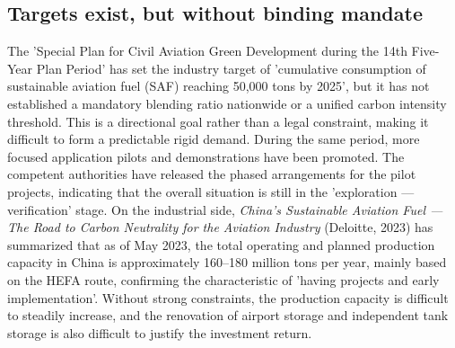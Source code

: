\documentclass[a4paper,11pt]{article}
\begin{document}
\subsection{Targets exist, but without binding mandate}
The 'Special Plan for Civil Aviation Green Development during the 14th Five-Year Plan Period' \cite{caac2021} has set the industry target of 'cumulative consumption of sustainable aviation fuel (SAF) reaching 50,000 tons by 2025', but it has not established a mandatory blending ratio nationwide or a unified carbon intensity threshold. This is a directional goal rather than a legal constraint, making it difficult to form a predictable rigid demand. During the same period, more focused application pilots and demonstrations have been promoted. The competent authorities have released the phased arrangements for the pilot projects, indicating that the overall situation is still in the 'exploration --- verification' stage. On the industrial side, \textit{China's Sustainable Aviation Fuel --- The Road to Carbon Neutrality for the Aviation Industry} (Deloitte, 2023) \cite{deloitte2023} has summarized that as of May 2023, the total operating and planned production capacity in China is approximately 160--180 million tons per year, mainly based on the HEFA route, confirming the characteristic of 'having projects and early implementation'. Without strong constraints, the production capacity is difficult to steadily increase, and the renovation of airport storage and independent tank storage is also difficult to justify the investment return.
\end{document}
